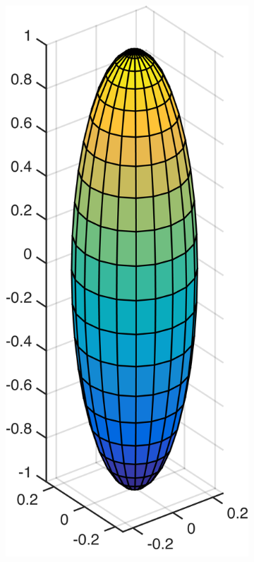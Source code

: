 \begin{figure}[!htbp]
  \centering
  \begin{subfigure}[h]{0.24\textwidth}
    \centering
    \includegraphics[width=\textwidth]{img/slender/1_4.png}

\end{subfigure}
\end{figure}
